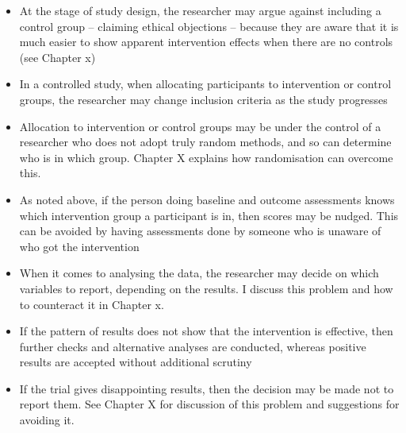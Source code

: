 \documentclass[]{book}
\providecommand{\tightlist}{%
  \setlength{\itemsep}{0pt}\setlength{\parskip}{0pt}}
\begin{document}
\begin{itemize}
\tightlist
\item
  At the stage of study design, the researcher may argue against including a control group -- claiming ethical objections -- because they are aware that it is much easier to show apparent intervention effects when there are no controls (see Chapter x)
\item
  In a controlled study, when allocating participants to intervention or control groups, the researcher may change inclusion criteria as the study progresses
\item
  Allocation to intervention or control groups may be under the control of a researcher who does not adopt truly random methods, and so can determine who is in which group. Chapter X explains how randomisation can overcome this.
\item
  As noted above, if the person doing baseline and outcome assessments knows which intervention group a participant is in, then scores may be nudged. This can be avoided by having assessments done by someone who is unaware of who got the intervention
\item
  When it comes to analysing the data, the researcher may decide on which variables to report, depending on the results. I discuss this problem and how to counteract it in Chapter x.
\item
  If the pattern of results does not show that the intervention is effective, then further checks and alternative analyses are conducted, whereas positive results are accepted without additional scrutiny
\item
  If the trial gives disappointing results, then the decision may be made not to report them. See Chapter X for discussion of this problem and suggestions for avoiding it.
\end{itemize}
\end{document}
